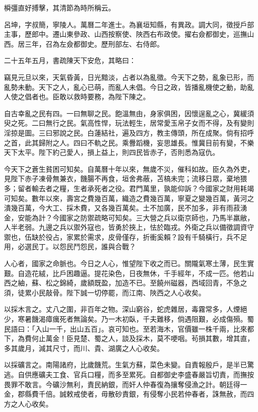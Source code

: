 \begin{pinyinscope}
橓彊直好搏擊，其清節為時所稱云。

呂坤，字叔簡，寧陵人。萬曆二年進士。為襄垣知縣，有異政。調大同，徵授戶部主事，歷郎中。遷山東參政、山西按察使、陜西右布政使。擢右僉都御史，巡撫山西。居三年，召為左僉都御史。歷刑部左、右侍郎。

二十五年五月，書疏陳天下安危，其略曰：

竊見元旦以來，天氣昏黃，日光黯淡，占者以為亂徵。今天下之勢，亂象已形，而亂勢未動。天下之人，亂心已萌，而亂人未倡。今日之政，皆播亂機使之動，助亂人使之倡者也。臣敢以救時要務，為陛下陳之。

自古幸亂之民有四。一曰無聊之民。飽溫無由，身家俱困，因懷逞亂之心，冀緩須臾之死。二曰無行之民。氣高性悍，玩法輕生，居常愛玉帛子女而不得，及有變則淫掠是圖。三曰邪說之民。白蓮結社，遍及四方，教主傳頭，所在成聚。倘有招呼之首，此其歸附之人。四曰不軌之民。乘釁蹈機，妄思雄長。惟冀目前有變，不樂天下太平。陛下約己愛人，損上益上，則四民皆赤子，否則悉為寇仇。

今天下之蒼生貧困可知矣。自萬曆十年以來，無歲不災，催科如故。臣久為外吏，見陛下赤子凍骨無兼衣，饑腸不再食，垣舍弗蔽，苫槁未完；流移日眾，棄地猥多；留者輸去者之糧，生者承死者之役。君門萬里，孰能仰訴？今國家之財用耗竭可知矣。數年以來，壽宮之費幾百萬，織造之費幾百萬，寧夏之變幾百萬，黃河之潰幾百萬，今大工、採木費，又各幾百萬矣。土不加廣，民不加多，非有雨菽湧金，安能為計？今國家之防禦疏略可知矣。三大營之兵以衛京師也，乃馬半羸敝，人半老弱。九邊之兵以禦外寇也，皆勇於挾上，怯於臨戎。外衛之兵以備徵調資守禦也，伍缺於役占，家累於需求，皮骨僅存，折衝奚賴？設有千騎橫行，兵不足用，必選民丁。以怨民鬥怨民，誰與合戰？

人心者，國家之命脈也。今日之人心，惟望陛下收之而已。關隴氣寒土薄，民生實艱。自造花絨，比戶困趣逼。提花染色，日夜無休，千手經年，不成一匹。他若山西之紬，蘇、松之錦綺，歲額既盈，加造不已。至饒州磁器，西域回青，不急之須，徒累小民敲骨。陛下誠一切停罷，而江南、陜西之人心收矣。

以採木言之。丈八之圍，非百年之物。深山窮谷，蛇虎雜居，毒霧常多，人煙絕少，寒暑饑渴瘴癘死者無論矣。乃一木初臥，千夫難移，倘遇阻艱，必成傷殞。蜀民語曰：「入山一千，出山五百」。哀可知也。至若海木，官價雖一株千兩，比來都下，為費何止萬金！臣見楚、蜀之人，談及採木，莫不哽咽。茍損其數，增其直，多其歲月，減其尺寸，而川、貴、湖廣之人心收矣。

以採礦言之。南陽諸府，比歲饑荒。生氣方蘇，菜色未變。自責報殷戶，是半已驚逃。自供應礦夫工食、官兵口糧，而多至累死。自都御史李盛春嚴旨切責，而撫按畏罪不敢言。今礦沙無利，責民納銀，而奸人仲春復為攘奪侵漁之計。朝廷得一金，郡縣費千倍。誠敕戒使者，毋散砂責銀，有侵奪小民若仲春者，誅無赦，而四方之人心收矣。


\end{pinyinscope}
